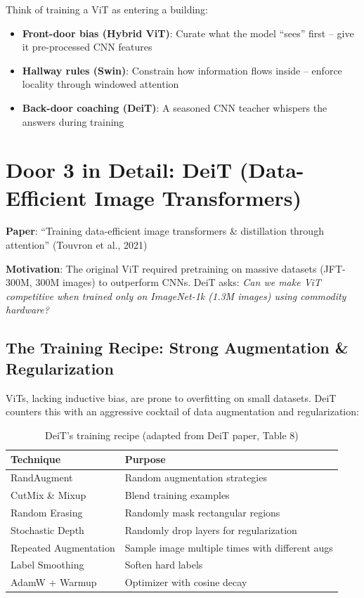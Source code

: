 \documentclass{article}
\begin{document}
\begin{tcolorbox}[colback=green!5!white, colframe=green!50!black, title=Teaching Metaphor]
Think of training a ViT as entering a building:

\begin{itemize}
\item \textbf{Front-door bias (Hybrid ViT)}: Curate what the model ``sees'' first -- give it pre-processed CNN features
\item \textbf{Hallway rules (Swin)}: Constrain how information flows inside -- enforce locality through windowed attention
\item \textbf{Back-door coaching (DeiT)}: A seasoned CNN teacher whispers the answers during training
\end{itemize}
\end{tcolorbox}

\section{Door 3 in Detail: DeiT (Data-Efficient Image Transformers)}
\label{sec:deit}

\textbf{Paper}: ``Training data-efficient image transformers \& distillation through attention'' (Touvron et al., 2021)

\textbf{Motivation}: The original ViT required pretraining on massive datasets (JFT-300M, 300M images) to outperform CNNs. DeiT asks: \textit{Can we make ViT competitive when trained only on ImageNet-1k (1.3M images) using commodity hardware?}

\subsection{The Training Recipe: Strong Augmentation \& Regularization}

ViTs, lacking inductive bias, are prone to overfitting on small datasets. DeiT counters this with an aggressive cocktail of data augmentation and regularization:

\begin{table}[h]
\centering
\begin{tabular}{ll}
\toprule
\textbf{Technique} & \textbf{Purpose} \\
\midrule
RandAugment & Random augmentation strategies \\
CutMix \& Mixup & Blend training examples \\
Random Erasing & Randomly mask rectangular regions \\
Stochastic Depth & Randomly drop layers for regularization \\
Repeated Augmentation & Sample image multiple times with different augs \\
Label Smoothing & Soften hard labels \\
AdamW + Warmup & Optimizer with cosine decay \\
\bottomrule
\end{tabular}
\caption{DeiT's training recipe (adapted from DeiT paper, Table 8)}
\end{table}
\end{document}
